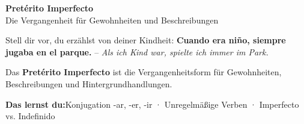\documentclass[11pt, a4paper]{article}
\newcommand{\seriftext}[1]{{\fontfamily{ppl}\selectfont #1}}
\newcommand{\thema}{Pretérito Imperfecto}
\newcommand{\untertitel}{Die Vergangenheit für Gewohnheiten und Beschreibungen}
\newcommand{\lernziele}{Konjugation -ar, -er, -ir · Unregelmäßige Verben · Imperfecto vs. Indefinido}
\newcommand{\es}[1]{\seriftext{\textbf{#1}}}
\newcommand{\de}[1]{\textit{\textcolor{akzent}{#1}}}
\begin{document}
\begin{center}
    {\LARGE\bfseries \thema}\\[3pt]
    {\small \untertitel}
\end{center}

\vspace{4pt}

Stell dir vor, du erzählst von deiner Kindheit: \es{Cuando era niño, siempre jugaba en el parque.} -- \de{Als ich Kind war, spielte ich immer im Park.}

Das \textbf{Pretérito Imperfecto} ist die Vergangenheitsform für Gewohnheiten, Beschreibungen und Hintergrundhandlungen.

\vspace{2pt}

\begin{lernzielbox}
\textbf{Das lernst du:}\quad \lernziele
\end{lernzielbox}

\end{document}
